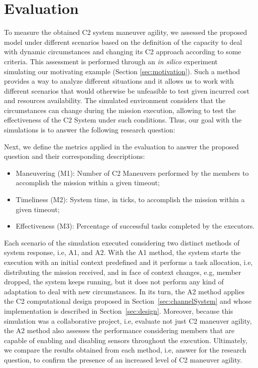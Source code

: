 \section{Evaluation}
\label{sec:evaluation}

To measure the obtained C2 system maneuver agility, we assessed the proposed model under different scenarios based on the definition of the capacity to deal with dynamic circumstances and changing its C2 approach according to some criteria. This assessment is performed through an \textit{in silico} experiment~\cite{simulation01} simulating our motivating example (Section \ref{sec:motivation}). Such a method provides a way to analyze different situations and it allows us to work with different scenarios that would otherwise be unfeasible to test given incurred cost and resources availability. The simulated environment considers that the circumstances can change during the mission execution, allowing to test the effectiveness of the C2 System under such conditions. Thus, our goal with the simulations is to answer the following research question:
 
\begin{center}
\end{center}

Next, we define the metrics applied in the evaluation to answer the proposed question and their corresponding descriptions:
\begin{itemize}
    \item Maneuvering (M1): Number of C2 Maneuvers performed by the members to accomplish the mission within a given timeout;
    \item Timeliness (M2): System time, in ticks, to accomplish the mission within a given timeout;
    \item Effectiveness (M3): Percentage of successful tasks completed by the executors.
\end{itemize}

Each scenario of the simulation executed considering two distinct methods of system response, i.e, A1, and A2. With the A1 method, the system starts the execution with an initial context predefined and it performs a task allocation, i.e, distributing the mission received, and in face of context changes, e.g, member dropped, the system keeps running, but it does not perform any kind of adaptation to deal with new circumstances. In its turn, the A2 method applies the C2 computational design proposed in Section~\ref{sec:channelSystem} and whose implementation is described in Section~\ref{sec:design}. Moreover, because this simulation was a collaborative project, i.e, evaluate not just C2 maneuver agility, the A2 method also assesses the performance considering members that are capable of enabling and disabling sensors throughout the execution. Ultimately, we compare the results obtained from each method, i.e, answer for the research question, to confirm the presence of an increased level of C2 maneuver agility.

